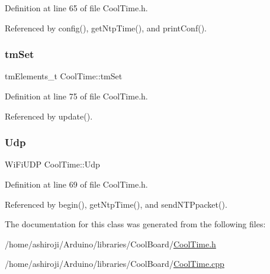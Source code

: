 Definition at line 65 of file Cool\+Time.\+h.



Referenced by config(), get\+Ntp\+Time(), and print\+Conf().

\mbox{\label{classCoolTime_ad33c2713c903ff064ad09c46406ae088}} 
\subsubsection{\texorpdfstring{tm\+Set}{tmSet}}
{\footnotesize\ttfamily tm\+Elements\+\_\+t Cool\+Time\+::tm\+Set\hspace{0.3cm}{\ttfamily [private]}}



Definition at line 75 of file Cool\+Time.\+h.



Referenced by update().

\mbox{\label{classCoolTime_a4e23216a8121ca79d0fb019f30884b92}} 
\subsubsection{\texorpdfstring{Udp}{Udp}}
{\footnotesize\ttfamily Wi\+Fi\+U\+DP Cool\+Time\+::\+Udp\hspace{0.3cm}{\ttfamily [private]}}



Definition at line 69 of file Cool\+Time.\+h.



Referenced by begin(), get\+Ntp\+Time(), and send\+N\+T\+Ppacket().



The documentation for this class was generated from the following files\+:\begin{DoxyCompactItemize}
\item 
/home/ashiroji/\+Arduino/libraries/\+Cool\+Board/\hyperlink{CoolTime_8h}{Cool\+Time.\+h}\item 
/home/ashiroji/\+Arduino/libraries/\+Cool\+Board/\hyperlink{CoolTime_8cpp}{Cool\+Time.\+cpp}\end{DoxyCompactItemize}
